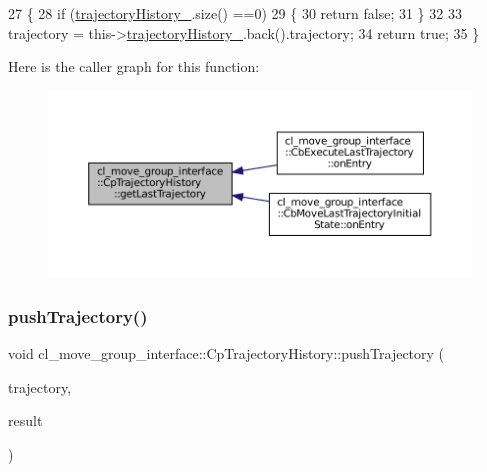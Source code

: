 \begin{DoxyCode}
27         \{
28             \textcolor{keywordflow}{if} (\hyperlink{classcl__move__group__interface_1_1CpTrajectoryHistory_ac5f17b74ca856f6f8ccb96d9a4786fb2}{trajectoryHistory\_}.size() ==0)
29             \{
30                 \textcolor{keywordflow}{return} \textcolor{keyword}{false};
31             \}
32 
33             trajectory = this->\hyperlink{classcl__move__group__interface_1_1CpTrajectoryHistory_ac5f17b74ca856f6f8ccb96d9a4786fb2}{trajectoryHistory\_}.back().trajectory;
34             \textcolor{keywordflow}{return} \textcolor{keyword}{true};
35         \}
\end{DoxyCode}
Here is the caller graph for this function\+:
\nopagebreak
\begin{figure}[H]
\begin{center}
\leavevmode
\includegraphics[width=350pt]{classcl__move__group__interface_1_1CpTrajectoryHistory_aa9026698871b1e9d3ef5ee29e362802f_icgraph}
\end{center}
\end{figure}
\mbox{\label{classcl__move__group__interface_1_1CpTrajectoryHistory_a27de15d0d6c5633475c59cd2ee3e7793}} 
\subsubsection{\texorpdfstring{push\+Trajectory()}{pushTrajectory()}}
{\footnotesize\ttfamily void cl\+\_\+move\+\_\+group\+\_\+interface\+::\+Cp\+Trajectory\+History\+::push\+Trajectory (\begin{DoxyParamCaption}\item[{const moveit\+\_\+msgs\+::\+Robot\+Trajectory \&}]{trajectory,  }\item[{moveit\+\_\+msgs\+::\+Move\+It\+Error\+Codes}]{result }\end{DoxyParamCaption})\hspace{0.3cm}{\ttfamily [inline]}}



